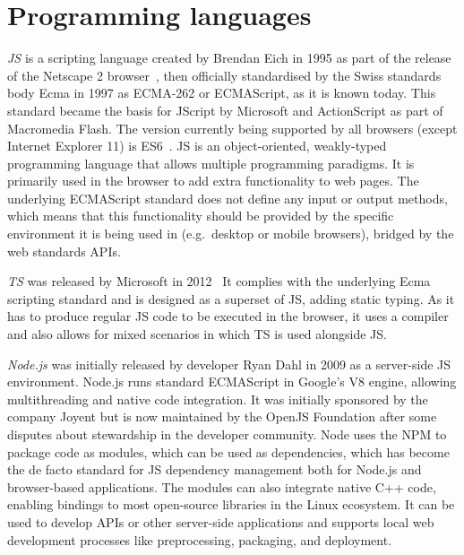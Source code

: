 \section{Programming languages}
\label{sec:programming-languages}



\emph{\ac{JS}} is a scripting language created by Brendan Eich in 1995 as part of the release of the Netscape 2 browser~\parencite{javascriptRelease}, then officially standardised by the Swiss standards body Ecma in 1997 as ECMA-262 or ECMAScript, as it is known today.
This standard became the basis for JScript by Microsoft and ActionScript as part of Macromedia Flash.
The version currently being supported by all browsers (except Internet Explorer 11) is \ac{ES6}~\parencite{javascriptHistory}.
\ac{JS} is an object-oriented, weakly-typed programming language that allows multiple programming paradigms.
It is primarily used in the browser to add extra functionality to web pages.
The underlying ECMAScript standard does not define any input or output methods, which means that this functionality should be provided by the specific environment it is being used in (e.g.\ desktop or mobile browsers), bridged by the web standards \ac{API}s.

\emph{\ac{TS}} was released by Microsoft in 2012~ It complies with the underlying Ecma scripting standard and is designed as a superset of \ac{JS}, adding static typing.
As it has to produce regular \ac{JS} code to be executed in the browser, it uses a compiler and also allows for mixed scenarios in which \ac{TS} is used alongside \ac{JS}.

\emph{Node.js} was initially released by developer Ryan Dahl in 2009 as a server-side \ac{JS} environment.
Node.js runs standard ECMAScript in Google's V8 engine, allowing multithreading and native code integration.
It was initially sponsored by the company Joyent but is now maintained by the OpenJS Foundation after some disputes about stewardship in the developer community.
Node uses the \ac{NPM} to package code as modules, which can be used as dependencies, which has become the de facto standard for \ac{JS} dependency management both for Node.js and browser-based applications.
The modules can also integrate native C++ code, enabling bindings to most open-source libraries in the Linux ecosystem.
It can be used to develop \ac{API}s or other server-side applications and supports local web development processes like preprocessing, packaging, and deployment.

